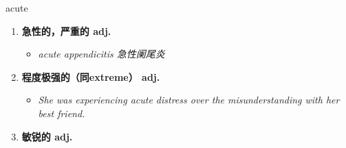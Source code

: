 
\begin{frame}
{\huge acute}
\begin{center}
\begin{enumerate}\Large
  \item \textbf{急性的，严重的 adj.}
  \begin{itemize}
    \item \em{\Large{acute appendicitis 急性阑尾炎}}
  \end{itemize}
  \item \textbf{程度极强的（同extreme） adj.}
  \begin{itemize}
    \item \em{\Large{She was experiencing acute distress over the misunderstanding with her best friend.}}
  \end{itemize}
  \item \textbf{敏锐的 adj.}
\end{enumerate}
\end{center}
\end{frame}
